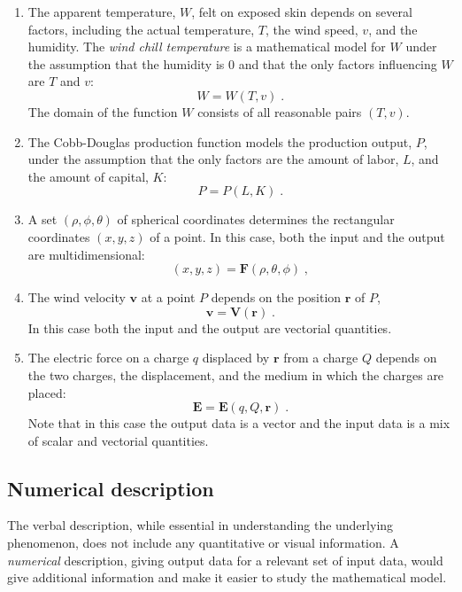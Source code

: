 \begin{enumerate}
  \item The apparent temperature, $W$, felt on exposed skin
  depends on several factors, including the actual
  temperature, $T$, the wind speed, $v$, and the humidity.
  The \emph{wind chill temperature} is a mathematical model
  for $W$ under the assumption that the humidity is 0 and
  that the only factors influencing $W$ are $T$ and $v$:
  $$W = W(T,v)\; .$$
  The domain of the function $W$ consists of all reasonable
  pairs $(T,v)$.

  \item The Cobb-Douglas production function models the
  production output, $P$, under the assumption that the
  only factors are the amount of labor, $L$, and the
  amount of capital, $K$:
  $$P=P(L,K) \; .$$


  \item A set $(\rho, \phi, \theta)$ of spherical
  coordinates determines the rectangular coordinates
  $(x,y,z)$ of a point. In this case, both the input
  and the output are multidimensional:
  $$(x,y,z) = \textbf{F}(\rho, \theta, \phi)\; ,$$

  \item The wind velocity $\textbf{v}$ at a point $P$
  depends on the position $\textbf{r}$ of $P$,
  $$\textbf{v} = \textbf{V} (\textbf{r})\; .$$
  In this case both the input and the output are
  vectorial quantities.

  \item The electric force on a charge $q$ displaced
  by $\textbf{r}$ from a charge $Q$ depends on the
  two charges, the displacement, and the medium in
  which the charges are placed:
  $$\textbf{E} =
  \textbf{E}(q, Q,\textbf{r})\; .$$
  Note that in this case the output data
  is a vector and the input data is a mix of scalar
  and vectorial quantities.
\end{enumerate}


\subsection{Numerical description}

The verbal description, while essential in understanding
the underlying phenomenon, does not include any quantitative
or visual information. A \emph{numerical} description,
giving output data for a relevant set of input data,
would give additional information and make it easier to
study the mathematical model.

